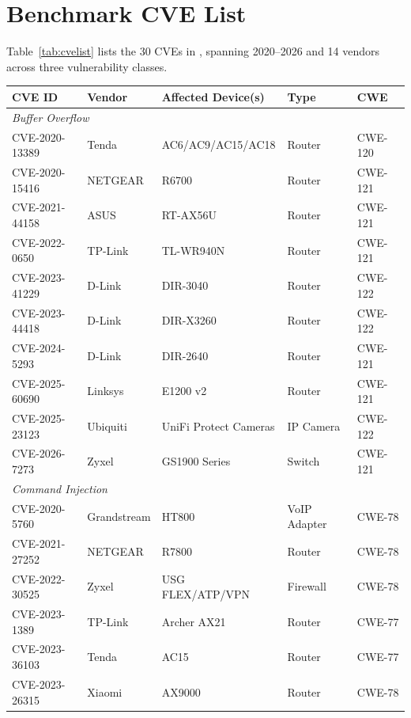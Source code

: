 

\section{Benchmark CVE List}
\label{app:cvelist}

Table~\ref{tab:cvelist} lists the 30 CVEs in \sys{}, spanning 2020--2026 and 14 vendors across three vulnerability classes.

\begin{table}[t]
\centering

\small
\renewcommand{\arraystretch}{1.1}
\begin{tabular}{l l l l l}
\toprule
\textbf{CVE ID} & \textbf{Vendor} & \textbf{Affected Device(s)} & \textbf{Type} & \textbf{CWE} \\
\midrule
\multicolumn{5}{l}{\textit{Buffer Overflow}} \\
CVE-2020-13389 & Tenda & AC6/AC9/AC15/AC18 & Router & CWE-120 \\
CVE-2020-15416 & NETGEAR & R6700 & Router & CWE-121 \\
CVE-2021-44158 & ASUS & RT-AX56U & Router & CWE-121 \\
CVE-2022-0650 & TP-Link & TL-WR940N & Router & CWE-121 \\
CVE-2023-41229 & D-Link & DIR-3040 & Router & CWE-122 \\
CVE-2023-44418 & D-Link & DIR-X3260 & Router & CWE-122 \\
CVE-2024-5293 & D-Link & DIR-2640 & Router & CWE-121 \\
CVE-2025-60690 & Linksys & E1200 v2 & Router & CWE-121 \\
CVE-2025-23123 & Ubiquiti & UniFi Protect Cameras & IP Camera & CWE-122 \\
CVE-2026-7273 & Zyxel & GS1900 Series & Switch & CWE-121 \\
\midrule
\multicolumn{5}{l}{\textit{Command Injection}} \\
CVE-2020-5760 & Grandstream & HT800 & VoIP Adapter & CWE-78 \\
CVE-2021-27252 & NETGEAR & R7800 & Router & CWE-78 \\
CVE-2022-30525 & Zyxel & USG FLEX/ATP/VPN & Firewall & CWE-78 \\
CVE-2023-1389 & TP-Link & Archer AX21 & Router & CWE-77 \\
CVE-2023-36103 & Tenda & AC15 & Router & CWE-77 \\
CVE-2023-26315 & Xiaomi & AX9000 & Router & CWE-78 \\

\end{tabular}
\end{table}
